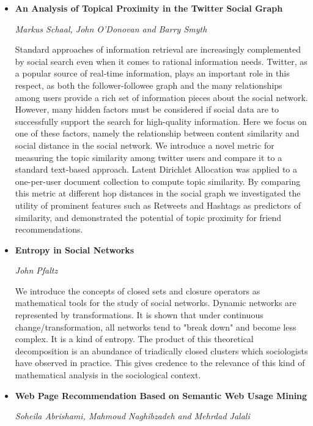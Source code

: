 \begin{itemize}
\item \textbf{An Analysis of Topical Proximity in the Twitter Social Graph}

\textit{Markus Schaal, John O'Donovan and Barry Smyth}

Standard approaches of information retrieval are increasingly complemented by
social search even when it comes to rational information needs. Twitter, as a
popular source of real-time information, plays an important role in this
respect, as both the follower-followee graph and the many relationships among
users provide a rich set of information pieces about the social network.
However, many hidden factors must be considered if social data are to
successfully support the search for high-quality information.
Here we focus on one of these factors, namely the relationship between content
similarity and social distance in the social network. We introduce a novel
metric for measuring the topic similarity among twitter users and compare it to
a standard text-based approach. Latent Dirichlet Allocation was applied
to a one-per-user document collection to compute topic similarity. By comparing
this metric at different hop
distances in the social graph we investigated the utility of prominent features
such as Retweets and Hashtags as predictors of similarity, and demonstrated the
potential of topic proximity for friend recommendations.

\item \textbf{Entropy in Social Networks}

\textit{John Pfaltz}

We introduce the concepts of closed sets and closure operators as mathematical
tools for the study of social networks. Dynamic networks are represented by
transformations.
It is shown that under continuous change/transformation, all networks tend to
"break down" and become less complex. It is a kind of entropy.
The product of this theoretical decomposition is an abundance of triadically
closed clusters which sociologists have observed in practice. This gives
credence to the relevance of this kind of mathematical analysis in the
sociological context.

\item \textbf{Web Page Recommendation Based on Semantic Web Usage Mining}

\textit{Soheila Abrishami, Mahmoud Naghibzadeh and Mehrdad Jalali}


\end{itemize}

